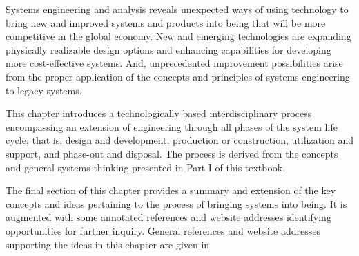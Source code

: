 Systems engineering and analysis reveals unexpected ways of using technology to bring new and improved systems and products into being that will be more competitive in the global economy. New and emerging technologies are expanding physically realizable design options and enhancing capabilities for developing more cost-effective systems. And, unprecedented improvement possibilities arise from the proper application of the concepts and principles of systems engineering to legacy systems.

This chapter introduces a technologically based interdisciplinary process encompassing an extension of engineering through all phases of the system life cycle; that is, design and development, production or construction, utilization and support, and phase-out and disposal. The process is derived from the concepts and general systems thinking presented in Part I of this textbook.

The final section of this chapter provides a summary and extension of the key concepts and ideas pertaining to the process of bringing systems into being. It is augmented with some annotated references and website addresses identifying opportunities for further inquiry. General references and website addresses supporting the ideas in this chapter are given in 